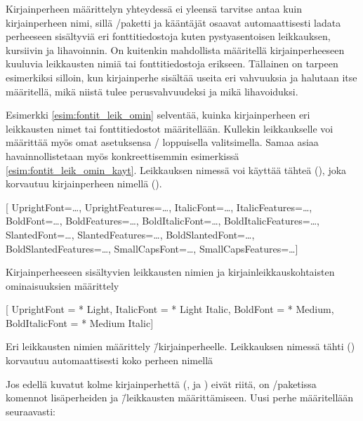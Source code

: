 Kirjainperheen määrittelyn yhteydessä ei yleensä tarvitse antaa kuin
kirjainperheen nimi, sillä \-/paketti ja kääntäjät
osaavat automaattisesti ladata perheeseen sisältyviä eri
fonttitiedostoja kuten pystyasentoisen leikkauksen, kursiivin ja
lihavoinnin. On kuitenkin mahdollista määritellä kirjainperheeseen
kuuluvia leikkausten nimiä tai fonttitiedostoja erikseen. Tällainen on
tarpeen esimerkiksi silloin, kun kirjainperhe sisältää useita eri
vahvuuksia ja halutaan itse määritellä, mikä niistä tulee
perusvahvuudeksi ja mikä lihavoiduksi.

Esimerkki \ref{esim:fontit_leik_omin} selventää, kuinka kirjainperheen
eri leikkausten nimet tai fonttitiedostot määritellään. Kullekin
leikkaukselle voi määrittää myös omat asetuksensa \-/
loppuisella valitsimella. Samaa asiaa havainnollistetaan myös
konkreettisemmin esimerkissä \ref{esim:fontit_leik_omin_kayt}.
Leikkauksen nimessä voi käyttää tähteä (\koodi{*}), joka korvautuu
kirjainperheen nimellä ().

\begin{esimerkki*}
\begin{koodilohko}
  \setmainfont{…}[
    UprightFont={…},     UprightFeatures={…},
    ItalicFont={…},      ItalicFeatures={…},
    BoldFont={…},        BoldFeatures={…},
    BoldItalicFont={…},  BoldItalicFeatures={…},
    SlantedFont={…},     SlantedFeatures={…},
    BoldSlantedFont={…}, BoldSlantedFeatures={…},
    SmallCapsFont={…},   SmallCapsFeatures={…}]
\end{koodilohko}
\caption{Kirjainperheeseen sisältyvien leikkausten nimien ja
  kirjainleikkauskohtaisten ominaisuuksien määrittely}
\label{esim:fontit_leik_omin}
\end{esimerkki*}

\begin{esimerkki*}
\begin{koodilohko}
  \setmainfont{Macklin Text}[
    UprightFont    = {* Light},
    ItalicFont     = {* Light Italic},
    BoldFont       = {* Medium},
    BoldItalicFont = {* Medium Italic}]
\end{koodilohko}
\caption{Eri leikkausten nimien määrittely 
  \=/kirjainperheelle. Leikkauksen nimessä tähti (\koodi{*}) korvautuu
  automaattisesti koko perheen nimellä}
\label{esim:fontit_leik_omin_kayt}
\end{esimerkki*}

Jos edellä kuvatut kolme kirjainperhettä (,
 ja ) eivät riitä, on
\-/paketissa komennot lisäperheiden ja \=/leikkausten
määrittämiseen. Uusi perhe määritellään seu\-raa\-vasti:

